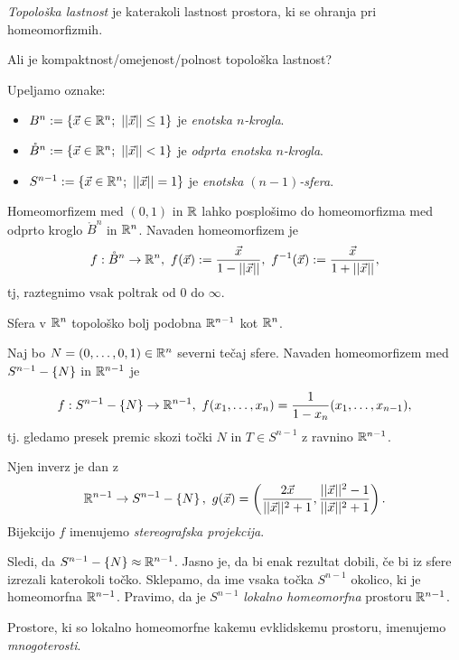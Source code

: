 \begin{definicija}
    \emph{Topološka lastnost} je katerakoli lastnost prostora, ki se ohranja pri homeomorfizmih.
\end{definicija}

\begin{primer}
    Ali je kompaktnost/omejenost/polnost topološka lastnost?
\end{primer}

Upeljamo oznake:
\begin{itemize}
    \item $B^n := \set{\vec{x} \in \RR^n; \ ||\vec{x}|| \leq 1}$ je \emph{enotska $n$-krogla}.
    \item $\mathring{B}^n := \left\{\vec{x} \in \mathbb{R}^n; \ ||\vec{x}|| < 1\right\}$ je \emph{odprta enotska $n$-krogla}.
    \item $S^{n-1} := \set{\vec{x} \in \RR^n; \ ||\vec{x}|| = 1}$ je \emph{enotska $(n-1)$-sfera}.
\end{itemize}

Homeomorfizem med $(0, 1)$ in $\mathbb{R}$ lahko posplošimo do homeomorfizma med odprto kroglo $\mathring{B}^n$ in $\mathbb{R}^n$. Navaden homeomorfizem je
$$f: \mathring{B}^n \to \mathbb{R}^n, \ f(\vec{x}) := \frac{\vec{x}}{1 - ||\vec{x}||}, \ f^{-1}(\vec{x}) := \frac{\vec{x}}{1 + ||\vec{x}||},$$
tj, raztegnimo vsak poltrak od $0$ do $\infty$.

Sfera v $\mathbb{R}^n$ topološko bolj podobna $\mathbb{R}^{n-1}$ kot $\mathbb{R}^n$.

Naj bo $N = (0, \ldots, 0, 1) \in \mathbb{R}^n$ severni tečaj sfere. Navaden homeomorfizem med $S^{n-1} - \left\{N\right\}$ in $\mathbb{R}^{n-1}$ je 

$$f: S^{n-1} - \set{N} \to \RR^{n-1}, \ f(x_1, \ldots, x_n) = \frac{1}{1 - x_n}(x_1, \ldots, x_{n-1}),$$
tj. gledamo presek premic skozi točki $N$ in $T \in S^{n-1}$ z ravnino $\mathbb{R}^{n-1}$.

Njen inverz je dan z
$$\mathbb{R}^{n-1} \to S^{n-1} - \left\{N\right\},\  g(\vec{x}) = \left(\frac{2\vec{x}}{||\vec{x}||^2 + 1}, \frac{||\vec{x}||^2-1}{||\vec{x}||^2+1}\right).$$
Bijekcijo $f$ imenujemo \emph{stereografska projekcija}.

Sledi, da $S^{n-1} - \left\{N\right\} \approx \mathbb{R}^{n-1}$. Jasno je, da bi enak rezultat dobili, če bi iz sfere izrezali katerokoli točko. Sklepamo, da ime vsaka točka $S^{n-1}$ okolico, ki je homeomorfna $\mathbb{R}^{n-1}$. Pravimo, da je $S^{n-1}$ \emph{lokalno homeomorfna} prostoru $\mathbb{R}^{n-1}$.

\begin{definicija}
    Prostore, ki so lokalno homeomorfne kakemu evklidskemu prostoru, imenujemo \emph{mnogoterosti}.
\end{definicija}
